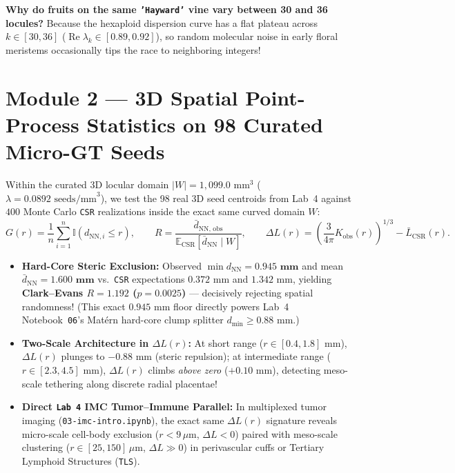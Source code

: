 \documentclass[10.5pt,a4paper]{article}
\begin{document}
\textbf{Why do fruits on the same \texttt{'Hayward'} vine vary between 30 and 36 locules?} Because the hexaploid dispersion curve has a flat plateau across $k \in [30, 36]$ ($\operatorname{Re}\lambda_k \in [0.89, 0.92]$), so random molecular noise in early floral meristems occasionally tips the race to neighboring integers!

\section{Module 2 --- 3D Spatial Point-Process Statistics on 98 Curated Micro-GT Seeds}
\label{sec:point-process}

Within the curated 3D locular domain $\lvert W\rvert = 1{,}099.0\text{ mm}^3$ ($\lambda = 0.0892\text{ seeds/mm}^3$), we test the 98 real 3D seed centroids from Lab~4 against $400$ Monte Carlo \texttt{CSR} realizations inside the exact same curved domain $W$:
\begin{equation}
    G(r) = \frac{1}{n}\sum_{i=1}^{n}\mathbb{I}(d_{\text{NN},i} \le r), \qquad R = \frac{\bar{d}_{\text{NN, obs}}}{\mathbb{E}_{\text{CSR}}[\bar{d}_{\text{NN}}\mid W]}, \qquad \Delta L(r) = \left(\frac{3}{4\pi}K_{\text{obs}}(r)\right)^{1/3} - \bar{L}_{\text{CSR}}(r).
\end{equation}
\begin{itemize}
    \item \textbf{Hard-Core Steric Exclusion:} Observed $\min d_{\text{NN}} = \mathbf{0.945\text{ mm}}$ and mean $\bar{d}_{\text{NN}} = \mathbf{1.600\text{ mm}}$ vs.\ \texttt{CSR} expectations $0.372\text{ mm}$ and $1.342\text{ mm}$, yielding \textbf{Clark--Evans $R = 1.192$ ($p = 0.0025$)} --- decisively rejecting spatial randomness! (This exact $0.945\text{ mm}$ floor directly powers Lab~4 Notebook~\texttt{06}'s Mat\'ern hard-core clump splitter $d_{\min}\ge 0.88\text{ mm}$.)
    \item \textbf{Two-Scale Architecture in $\Delta L(r)$:} At short range ($r \in [0.4, 1.8]\text{ mm}$), $\Delta L(r)$ plunges to $-0.88\text{ mm}$ (steric repulsion); at intermediate range ($r \in [2.3, 4.5]\text{ mm}$), $\Delta L(r)$ climbs \emph{above zero} ($+0.10\text{ mm}$), detecting meso-scale tethering along discrete radial placentae!
    \item \textbf{Direct \texttt{Lab 4} IMC Tumor--Immune Parallel:} In multiplexed tumor imaging (\texttt{03-imc-intro.ipynb}), the exact same $\Delta L(r)$ signature reveals micro-scale cell-body exclusion ($r < 9\,\mu\text{m}$, $\Delta L < 0$) paired with meso-scale clustering ($r \in [25, 150]\,\mu\text{m}$, $\Delta L \gg 0$) in perivascular cuffs or Tertiary Lymphoid Structures (\texttt{TLS}).
\end{itemize}
\end{document}

